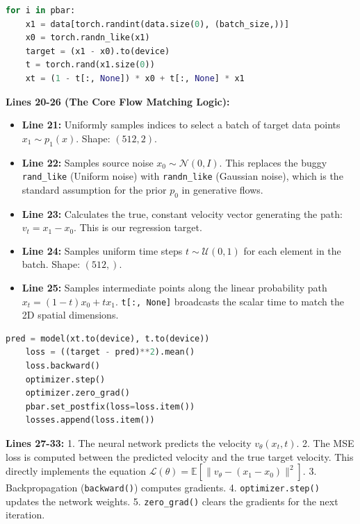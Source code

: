 \documentclass[12pt]{article}
\begin{document}
\begin{lstlisting}[language=Python]
for i in pbar:
    x1 = data[torch.randint(data.size(0), (batch_size,))]
    x0 = torch.randn_like(x1)
    target = (x1 - x0).to(device)
    t = torch.rand(x1.size(0))
    xt = (1 - t[:, None]) * x0 + t[:, None] * x1
\end{lstlisting}
\textbf{Lines 20-26 (The Core Flow Matching Logic):}
\begin{itemize}
    \item \textbf{Line 21:} Uniformly samples indices to select a batch of target data points $x_1 \sim p_1(x)$. Shape: $(512, 2)$.
    \item \textbf{Line 22:} Samples source noise $x_0 \sim \mathcal{N}(0, I)$. This replaces the buggy \texttt{rand\_like} (Uniform noise) with \texttt{randn\_like} (Gaussian noise), which is the standard assumption for the prior $p_0$ in generative flows.
    \item \textbf{Line 23:} Calculates the true, constant velocity vector generating the path: $v_t = x_1 - x_0$. This is our regression target.
    \item \textbf{Line 24:} Samples uniform time steps $t \sim \mathcal{U}(0, 1)$ for each element in the batch. Shape: $(512,)$.
    \item \textbf{Line 25:} Samples intermediate points along the linear probability path $x_t = (1-t)x_0 + tx_1$. \texttt{t[:, None]} broadcasts the scalar time to match the 2D spatial dimensions.
\end{itemize}

\begin{lstlisting}[language=Python]
    pred = model(xt.to(device), t.to(device))
    loss = ((target - pred)**2).mean()
    loss.backward()
    optimizer.step()
    optimizer.zero_grad()
    pbar.set_postfix(loss=loss.item())
    losses.append(loss.item())
\end{lstlisting}
\textbf{Lines 27-33:}
1. The neural network predicts the velocity $v_\theta(x_t, t)$.
2. The MSE loss is computed between the predicted velocity and the true target velocity. This directly implements the equation $\mathcal{L}(\theta) = \mathbb{E}[\| v_\theta - (x_1 - x_0) \|^2]$.
3. Backpropagation (\texttt{backward()}) computes gradients.
4. \texttt{optimizer.step()} updates the network weights.
5. \texttt{zero\_grad()} clears the gradients for the next iteration.
\end{document}
